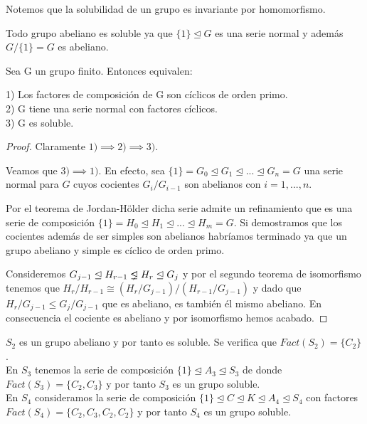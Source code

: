 Notemos que la solubilidad de un grupo es invariante por homomorfismo.

\begin{ejemplo}
Todo grupo abeliano es soluble ya que $\{1\} \trianglelefteq G$ es una serie normal y además $G/\{1\} = G$ es abeliano.
\end{ejemplo}

\begin{nth}
Sea G un grupo finito. Entonces equivalen:

1) Los factores de composición de G son cíclicos de orden primo.\\
2) G tiene una serie normal con factores cíclicos.\\
3) G es soluble.
\end{nth}
\begin{proof}
Claramente $1) \implies 2) \implies 3)$.

Veamos que $3) \implies 1)$. En efecto, sea $\{1\} = G_0 \trianglelefteq G_1 \trianglelefteq ... \trianglelefteq G_n = G$ una serie normal para $G$ cuyos cocientes $G_i/G_{i-1}$ son abelianos con $i = 1, ... ,n$.

Por el teorema de Jordan-Hölder dicha serie admite un refinamiento que es una serie de composición $\{1\} = H_0 \trianglelefteq H_1 \trianglelefteq ... \trianglelefteq H_m = G$. Si demostramos que los cocientes además de ser simples son abelianos habríamos terminado ya que un grupo abeliano y simple es cíclico de orden primo. 

Consideremos $G_{j-1} \trianglelefteq H_{r-1} \propernormal H_{r} \trianglelefteq G_{j}$ y por el segundo teorema de isomorfismo tenemos que $H_r/H_{r-1} \cong (H_r/G_{j-1})/(H_{r-1}/G_{j-1})$ y dado que $H_r/G_{j-1} \le G_j/G_{j-1}$ que es abeliano, es también él mismo abeliano. En consecuencia el cociente es abeliano y por isomorfismo hemos acabado.
\end{proof}

\begin{ejemplo}
$S_2$ es un grupo abeliano y por tanto es soluble. Se verifica que $Fact(S_2) = \{C_2\}$.\\
En $S_3$ tenemos la serie de composición $\{1\} \trianglelefteq A_3 \trianglelefteq S_3$ de donde $Fact(S_3) = \{C_2,C_3\}$ y por tanto $S_3$ es un grupo soluble.\\
En $S_4$ consideramos la serie de composición $\{1\} \trianglelefteq C \trianglelefteq K \trianglelefteq A_4 \trianglelefteq S_4$ con factores $Fact(S_4) = \{C_2,C_3,C_2,C_2\}$ y por tanto $S_4$ es un grupo soluble.
\end{ejemplo}

